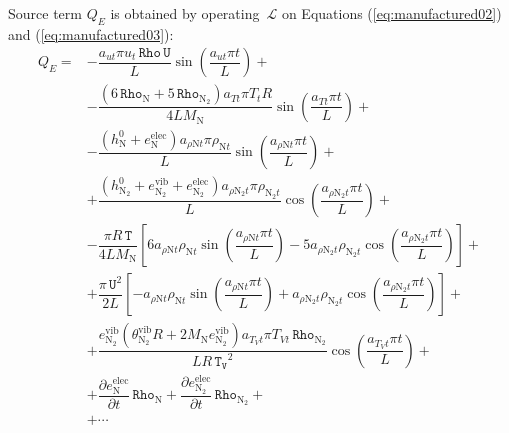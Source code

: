\documentclass[10pt]{article}
\newcommand{\diff}[2] {\dfrac{\partial #1 }{\partial #2}}
\newcommand{\Lo}{\,\mathcal{L}}
\newcommand{\Rho}{\,\mathtt{Rho}}
\newcommand{\T}{\,\mathtt{T}}
\newcommand{\U}{\,\mathtt{U}}
\newcommand{\TV}{\,\mathtt{T_V}}
\newcommand{\N}{\text{N}}
\newcommand{\elec}{\text{elec}}
\newcommand{\vib}{\text{vib}}
\begin{document}
Source term $Q_E$ is obtained by operating $\Lo$ on Equations (\ref{eq:manufactured02}) and (\ref{eq:manufactured03}):
\begin{equation}
\begin{split}
Q_E =& -\dfrac{a_{ut} \pi u_t \Rho \U }{L}\sin\left(\dfrac{a_{ut} \pi t}{L}\right) +\\ 
&- \dfrac{(6 \Rho_{\N}+5 \Rho_{\N_2}) a_{Tt} \pi T_t R }{4L M_\N}\sin\left(\dfrac{a_{Tt} \pi t}{L}\right) +\\ 
&-\dfrac{(h_{\N}^0+e_{\N}^{\elec}) a_{\rho \N t} \pi \rho_{\N t} }{L}\sin\left(\dfrac{a_{\rho \N t} \pi t}{L}\right) +\\ 
&+\dfrac{(h_{\N_2}^0+e_{\N_2}^{\vib}+e_{\N_2}^{\elec}) a_{\rho \N_2 t} \pi \rho_{\N_2 t} }{L}\cos\left(\dfrac{a_{\rho \N_2 t} \pi t}{L}\right) +\\ 
&-\dfrac{\pi R \T}{4L M_\N} \left[6 a_{\rho \N t} \rho_{\N t} \sin\left(\dfrac{a_{\rho \N t} \pi t}{L}\right)-5 a_{\rho \N_2 t} \rho_{\N_2 t} \cos\left(\dfrac{a_{\rho \N_2 t} \pi t}{L}\right)\right]  +\\ 
&+\dfrac{ \pi \U^2}{2L} \left[-a_{\rho \N t} \rho_{\N t} \sin\left(\dfrac{a_{\rho \N t} \pi t}{L}\right)+a_{\rho \N_2 t} \rho_{\N_2 t} \cos\left(\dfrac{a_{\rho \N_2 t} \pi t}{L}\right) \right] +\\ 
&+\dfrac{e_{\N_2}^{\vib} (\theta^{\vib}_{\N_2} R+2 M_\N e_{\N_2}^{\vib}) a_{T_V t} \pi T_{Vt} \Rho_{\N_2} }{L R \TV^2} \cos\left(\dfrac{a_{T_V t} \pi t}{L}\right)+\\ 
&+\diff{e_{\N}^{\elec}}{t}  \Rho_{\N}+\diff{e_{\N_2}^{\elec}}{t}  \Rho_{\N_2}+\\ 
&+\cdots
%
\end{split}
\end{equation}
\end{document}
